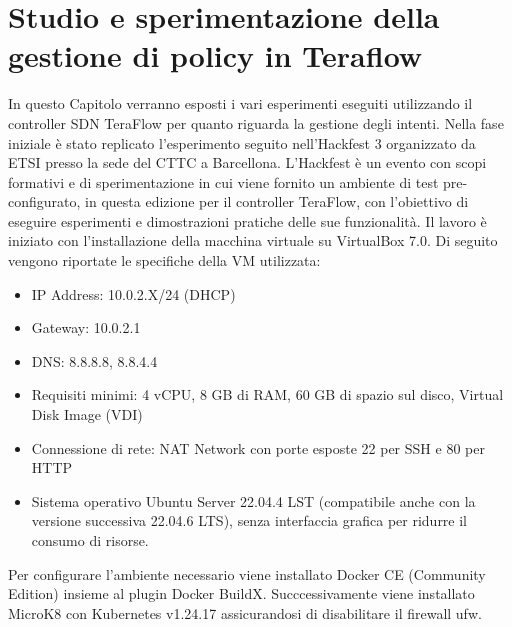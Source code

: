 \chapter{Studio e sperimentazione della gestione di policy in Teraflow}
\label{cap:policy}
In questo Capitolo verranno esposti i vari esperimenti eseguiti utilizzando il controller SDN TeraFlow per quanto riguarda la gestione degli intenti.
Nella fase iniziale è stato replicato l'esperimento seguito nell'Hackfest 3 \cite{hackfest} organizzato da ETSI presso la sede del CTTC a Barcellona.
L'Hackfest è un evento con scopi formativi e di sperimentazione in cui viene fornito un ambiente di test pre-configurato, in questa edizione 
per il controller TeraFlow, con l'obiettivo di eseguire esperimenti e dimostrazioni pratiche delle sue funzionalità. 
\newline Il lavoro è iniziato con l'installazione della macchina virtuale \cite{VM} su VirtualBox 7.0.
Di seguito vengono riportate le specifiche della VM utilizzata:
\begin{itemize}
    \item IP Address: 10.0.2.X/24 (DHCP)
    \item Gateway: 10.0.2.1
    \item DNS: 8.8.8.8, 8.8.4.4
    \item Requisiti minimi: 4 vCPU, 8 GB di RAM, 60 GB di spazio sul disco, Virtual Disk Image (VDI)
    \item Connessione di rete: NAT Network con porte esposte 22 per SSH e 80 per HTTP
    \item Sistema operativo Ubuntu Server 22.04.4 LST (compatibile anche con la versione successiva 22.04.6 LTS), senza interfaccia grafica per ridurre il consumo di risorse.
\end{itemize}
Per configurare l'ambiente necessario viene installato Docker CE (Community Edition) insieme al plugin Docker BuildX. Succcessivamente 
viene installato MicroK8 con Kubernetes v1.24.17 assicurandosi di disabilitare il firewall ufw. 
